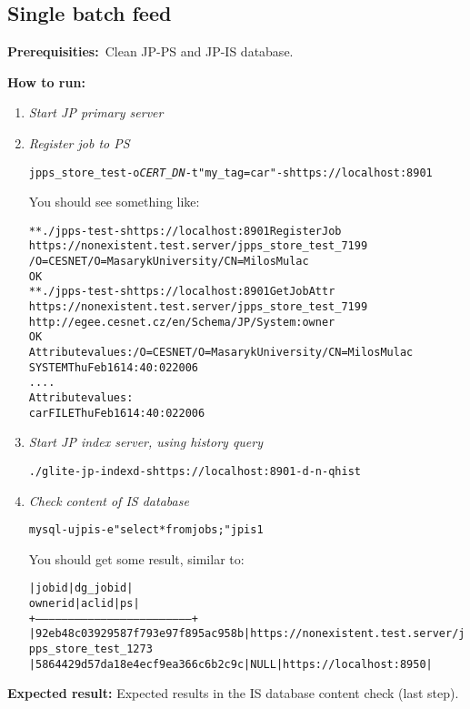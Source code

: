 \documentclass{egee}
\def\req{\noindent\textbf{Prerequisities:}}
\def\how{\noindent\textbf{How to run:}}
\def\result{\noindent\textbf{Expected result:}}
\begin{document}
\subsection{Single batch feed}

\req\ Clean JP-PS and JP-IS database.

\how\
\begin{enumerate}
 \item \emph{Start JP primary server}
 \item \emph{Register job to PS}
  \begin{alltt}
    jpps_store_test -o \emph{CERT_DN} -t "my_tag=car" -s https://localhost:8901  
  \end{alltt}
  You should see something like:
  \begin{alltt}
    ** ./jpps-test -s https://localhost:8901 RegisterJob
    https://nonexistent.test.server/jpps_store_test_7199
           /O=CESNET/O=Masaryk University/CN=Milos Mulac
    OK
    ** ./jpps-test -s https://localhost:8901 GetJobAttr
    https://nonexistent.test.server/jpps_store_test_7199
           http://egee.cesnet.cz/en/Schema/JP/System:owner
    OK
    Attribute values: /O=CESNET/O=Masaryk University/CN=Milos Mulac
           SYSTEM  Thu Feb 16 14:40:02 2006
    ....
    Attribute values:
           car     FILE    Thu Feb 16 14:40:02 2006
  \end{alltt}
 \item \emph{Start JP index server, using history query}\\
  \begin{alltt}
  ./glite-jp-indexd -s https://localhost:8901 -d -n -q hist 
  \end{alltt}
 \item \emph{Check content of IS database}\\
  \begin{alltt}
   mysql -u jpis -e "select * from jobs;" jpis1
  \end{alltt}
 You should get some result, similar to:
  \begin{alltt}
| jobid                            | dg_jobid | 
ownerid                            | aclid | ps                     |
+------------------------------------------------------------------------+
| 92eb48c03929587f793e97f895ac958b |https://nonexistent.test.server/jpps_store_test_1273 
| 5864429d57da18e4ecf9ea366c6b2c9c | NULL  | https://localhost:8950 |
  \end{alltt}
\end{enumerate}
\result{} Expected results in the IS database content check (last step).
\end{document}
